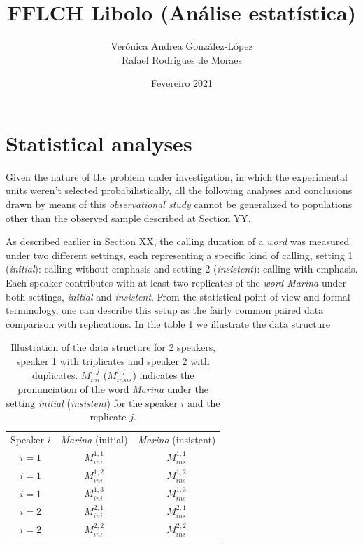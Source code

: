 \documentclass[11pt]{article}
\title{FFLCH Libolo (Análise estatística)}
\author{Verónica Andrea González-López \\ Rafael Rodrigues de Moraes}
\date{Fevereiro 2021}
\begin{document}
\maketitle

\section{Statistical analyses}

Given the nature of the problem under investigation, in which the experimental units weren't selected probabilistically, all the following analyses and conclusions drawn by means of this \textit{observational study} cannot be generalized to populations other than the observed sample described at Section YY.

As described earlier in Section XX, the calling duration of a {\it{word}} was measured under two different settings, each representing a specific kind of calling, setting 1 ({\it{initial}}): calling without emphasis and setting 2 ({\it{insistent}}): calling with emphasis. Each speaker contributes with at least two replicates of the {\it{word Marina}} under both settings, {\it{initial}} and {\it{insistent}}.  
From the statistical point of view and formal terminology, one can describe this setup as the fairly common paired data comparison with replications. In the table \ref{tab:datastructure} we illustrate the data structure 

\begin{table}[h!]
 \caption{Illustration of the data structure for 2 speakers, speaker 1 with triplicates and speaker 2 with duplicates. $M_{ini}^{i,j}$ ($M_{insis}^{i,j}$) indicates the pronunciation of the word {\it{Marina}} under the setting {\it{initial}} ({\it{insistent}}) for the speaker $i$ and the replicate $j.$}
    \label{tab:datastructure}
    \centering
    \begin{tabular}{c|c|c}
        Speaker $i$ & {\it{Marina}} (initial) &{\it{Marina}} (insistent)  \\
        $i=1$ & $M_{ini}^{1,1}$ & $M_{ins}^{1,1}$\\
        $i=1$ & $M_{ini}^{1,2}$ & $M_{ins}^{1,2}$\\
        $i=1$ & $M_{ini}^{1,3}$ & $M_{ins}^{1,3}$\\ \hline
        $i=2$ & $M_{ini}^{2,1}$ & $M_{ins}^{2,1}$\\
        $i=2$ & $M_{ini}^{2,2}$ & $M_{ins}^{2,2}$
    \end{tabular}
\end{table}
\end{document}
